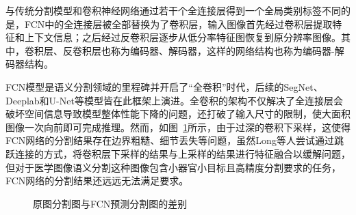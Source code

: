 与传统分割模型和卷积神经网络通过若干个全连接层得到一个全局类别标签不同的是，FCN中的全连接层被全部替换为了卷积层，输入图像首先经过卷积层提取特征和上下文信息；之后经过反卷积层逐步从低分率特征图恢复到原分辨率图像。其中，卷积层、反卷积层也称为编码器、解码器，这样的网络结构也称为编码器-解码器结构。

FCN模型是语义分割领域的里程碑并开启了“全卷积”时代，后续的SegNet、Deeplab和U-Net等模型皆在此框架上演进。全卷积的架构不仅解决了全连接层会破坏空间信息导致模型整体性能下降的问题，还打破了输入尺寸的限制，使大面积图像一次向前即可完成推理。然而，如图~\ref{fig:fcn_pre}所示，由于过深的卷积下采样，这使得FCN网络的分割结果存在边界粗糙、细节丢失等问题，虽然Long等人尝试通过跳跃连接的方式，将卷积层下采样的结果与上采样的结果进行特征融合以缓解问题，但对于医学图像语义分割这种图像包含小器官小目标且高精度分割要求的任务，FCN网络的分割结果还远远无法满足要求。

\begin{figure}[htbp]
    \centering
    \hspace{1cm}
    \hspace{1cm}
    \caption{原图分割图与FCN预测分割图的差别\cite{shelhamer2016}}
    \label{fig:fcn_pre}
\end{figure}

